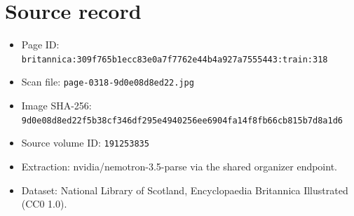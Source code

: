 \documentclass{article}
\begin{document}
\section*{Source record}
\begin{itemize}
\item Page ID: \texttt{britannica:309f765b1ecc83e0a7f7762e44b4a927a7555443:train:318}
\item Scan file: \texttt{page-0318-9d0e08d8ed22.jpg}
\item Image SHA-256: \texttt{9d0e08d8ed22f5b38cf346df295e4940256ee6904fa14f8fb66cb815b7d8a1d6}
\item Source volume ID: \texttt{191253835}
\item Extraction: nvidia/nemotron-3.5-parse via the shared organizer endpoint.
\item Dataset: National Library of Scotland, Encyclopaedia Britannica Illustrated (CC0 1.0).
\end{itemize}
\end{document}
